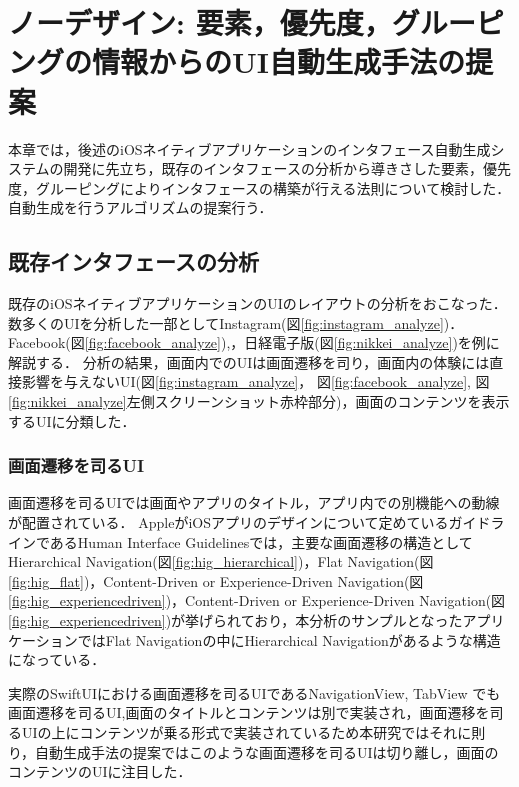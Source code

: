 \chapter{ノーデザイン: 要素，優先度，グルーピングの情報からのUI自動生成手法の提案}
\label{chap:auto-gen}

本章では，後述のiOSネイティブアプリケーションのインタフェース自動生成システムの開発に先立ち，既存のインタフェースの分析から導きさした要素，優先度，グルーピングによりインタフェースの構築が行える法則について検討した．自動生成を行うアルゴリズムの提案行う．
\section{既存インタフェースの分析}
既存のiOSネイティブアプリケーションのUIのレイアウトの分析をおこなった．数多くのUIを分析した一部としてInstagram(図\ref{fig:instagram_analyze})． Facebook(図\ref{fig:facebook_analyze}),，日経電子版(図\ref{fig:nikkei_analyze})を例に解説する．
分析の結果，画面内でのUIは画面遷移を司り，画面内の体験には直接影響を与えないUI(図\ref{fig:instagram_analyze}， 図\ref{fig:facebook_analyze}, 図\ref{fig:nikkei_analyze}左側スクリーンショット赤枠部分)，画面のコンテンツを表示するUIに分類した．


\subsection{画面遷移を司るUI}
画面遷移を司るUIでは画面やアプリのタイトル，アプリ内での別機能への動線が配置されている．
AppleがiOSアプリのデザインについて定めているガイドラインであるHuman Interface Guidelines\cite{hignavigation}では，主要な画面遷移の構造としてHierarchical Navigation(図\ref{fig:hig_hierarchical})，Flat Navigation(図\ref{fig:hig_flat})，Content-Driven or Experience-Driven Navigation(図\ref{fig:hig_experiencedriven})，Content-Driven or Experience-Driven Navigation(図\ref{fig:hig_experiencedriven})が挙げられており，本分析のサンプルとなったアプリケーションではFlat Navigationの中にHierarchical Navigationがあるような構造になっている．

実際のSwiftUIにおける画面遷移を司るUIであるNavigationView\cite{appledevelopernavigationview}, TabView\cite{appledevelopertabview} でも画面遷移を司るUI,画面のタイトルとコンテンツは別で実装され，画面遷移を司るUIの上にコンテンツが乗る形式で実装されているため本研究ではそれに則り，自動生成手法の提案ではこのような画面遷移を司るUIは切り離し，画面のコンテンツのUIに注目した．


